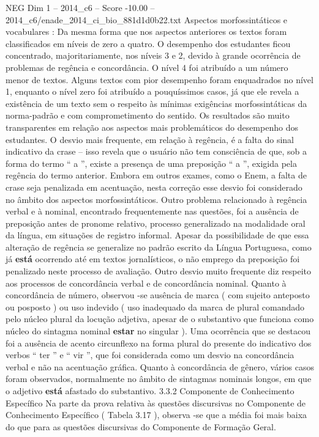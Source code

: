 \begin{textsample}{NEG Dim 1 – 2014\_c6 – Score -10.00 – 2014\_c6/enade\_2014\_ci\_bio\_881d1d0b22.txt}
Aspectos morfossintáticos e vocabulares : Da mesma forma que nos aspectos anteriores os textos foram classificados em níveis de zero a quatro.
O desempenho dos estudantes ficou concentrado, majoritariamente, nos níveis 3 e 2, devido à grande ocorrência de problemas de regência e concordância.
O nível 4 foi atribuído a um número menor de textos.
Alguns textos com pior desempenho foram enquadrados no nível 1, enquanto o nível zero foi atribuído a pouquíssimos casos, já que ele revela a existência de um texto sem o respeito às mínimas exigências morfossintáticas da norma-padrão e com comprometimento do sentido.
Os resultados são muito transparentes em relação aos aspectos mais problemáticos do desempenho dos estudantes.
O desvio mais frequente, em relação à regência, é a falta do sinal indicativo da crase – isso revela que o usuário não tem consciência de que, sob a forma do termo “ a ”, existe a presença de uma preposição “ a ”, exigida pela regência do termo anterior.
Embora em outros exames, como o Enem, a falta de crase seja penalizada em acentuação, nesta correção esse desvio foi considerado no âmbito dos aspectos morfossintáticos.
Outro problema relacionado à regência verbal e à nominal, encontrado frequentemente nas questões, foi a ausência de preposição antes de pronome relativo, processo generalizado na modalidade oral da língua, em situações de registro informal.
Apesar da possibilidade de que essa alteração de regência se generalize no padrão escrito da Língua Portuguesa, como já \textbf{está} ocorrendo até em textos jornalísticos, o não emprego da preposição foi penalizado neste processo de avaliação.
Outro desvio muito frequente diz respeito aos processos de concordância verbal e de concordância nominal.
Quanto à concordância de número, observou -se ausência de marca ( com sujeito anteposto ou posposto ) ou uso indevido ( uso inadequado da marca de plural comandado pelo núcleo plural da locução adjetiva, apesar de o substantivo que funciona como núcleo do sintagma nominal \textbf{estar} no singular ).
Uma ocorrência que se destacou foi a ausência de acento circunflexo na forma plural do presente do indicativo dos verbos “ ter ” e “ vir ”, que foi considerada como um desvio na concordância verbal e não na acentuação gráfica.
Quanto à concordância de gênero, vários casos foram observados, normalmente no âmbito de sintagmas nominais longos, em que o adjetivo \textbf{está} afastado do substantivo. 3.3.2 Componente de Conhecimento Específico Na parte da prova relativa às questões discursivas no Componente de Conhecimento Específico ( Tabela 3.17 ), observa -se que a média foi mais baixa do que para as questões discursivas do Componente de Formação Geral.

\end{textsample}
